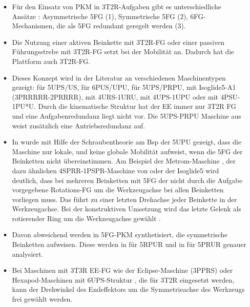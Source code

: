 \documentclass[robotics,article,submit,moreauthors,pdftex]{Definitions/mdpi}
\begin{document}
\begin{itemize}
	\item Für den Einsatz von PKM in 3T2R-Aufgaben gibt es unterschiedliche Ansätze \cite{Tale-MasoulehGos2011}: Asymmetrische 5FG (1), Symmetrische 5FG (2), 6FG-Mechanismen, die als 5FG redundant geregelt werden (3).
	\item Die Nutzung einer aktiven Beinkette mit 3T2R-FG oder einer passiven Führungsstrebe mit 3T2R-FG setzt bei der Mobilität an. Dadurch hat die Plattform auch 3T2R-FG.
	\item Dieses Konzept wird in der Literatur an verschiedenen Maschinentypen gezeigt:
	\cite{WangGos1997} für 5UPS/US,  \cite{LiuXuYaoXu2015,WenQinZhaLam2016} für 6PUS/UPU, \cite{ZhengGaoZha2005,GaoSunZha2004} für 5UPS/PRPU, \cite{Gogu2006} mit Isoglide5-A1 (3PRRRRR-2PRRRR), \cite{SchreiberGos2003} mit 4URS-1URU, \cite{MbarekNefCor2005,LinLiYanZha2013} mit 4UPS-1UPU oder \cite{GaoPenZhaLi2006} mit 4PSU-1PU*U. Durch die kinematische Struktur hat der EE immer nur 3T2R FG und eine Aufgabenredundanz liegt nicht vor. Die 5UPS-PRPU Maschine aus \cite{ChengWanZha2008} weist zusätzlich eine Antriebsredundanz auf.
	\item In \cite{HuangLi2002} wurde mit Hilfe der Schraubentheorie am Bsp der 5UPU gezeigt, dass die Maschine nur lokale, und keine globale Mobilität aufweist, wenn die 5FG der Beinketten nicht übereinstimmen. Am Beispiel der Metrom-Maschine \cite{BaerWei2006}, der dazu ähnlichen 4SPRR-1PSPR-Maschine von \cite{AlaghebandMahMilBen2015} oder der Isoglide5 \cite{Gogu2006} wird deutlich, dass bei mehreren Beinketten mit 5FG der nicht durch die Aufgabe vorgegebene Rotations-FG um die Werkzeugachse bei allen Beinketten vorliegen muss. Das führt zu einer letzten Drehachse jeder Beinkette in der Werkzeugachse. Bei der konstruktiven Umsetzung wird das letzte Gelenk als rotierender Ring um die Werkzeugachse gewählt \cite{BaerWei2006,AlaghebandMahMilBen2015}.
	\item Davon abweichend werden in \cite{KongGos2005} 5FG-PKM synthetisiert, die symmetrische Beinketten aufweisen. Diese werden in \cite{Tale-MasoulehGos2011} für 5RPUR und in \cite{Tale-MasoulehSaaGosTag2010} für 5PRUR genauer analysiert.
	\item Bei Maschinen mit 3T3R EE-FG wie der Eclipse-Maschine (3PPRS) \cite{HongKim2000} oder Hexapod-Maschinen mit 6UPS-Struktur \cite{MerletPerDan2000}, die für 3T2R eingesetzt werden, kann der Drehwinkel des Endeffektors um die Symmetrieachse des Werkzeugs frei gewählt werden.
\end{itemize}
\end{document}
